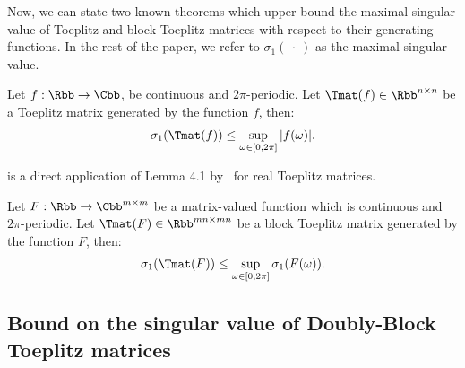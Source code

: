 Now, we can state two known theorems which upper bound the maximal singular value of Toeplitz and block Toeplitz matrices with respect to their generating functions.
In the rest of the paper, we refer to $\sigma_1(\ \cdot\ )$ as the maximal singular value. 

\begin{theorem} \label{theorem:teoplitz_sup_singular}
  Let $f: \Rbb \rightarrow \Cbb$, be continuous and $2\pi$-periodic. Let $\Tmat(f) \in \Rbb^{n \times n}$ be a Toeplitz matrix generated by the function $f$, then:
  \begin{align}
    \sigma_1 \left( \Tmat(f) \right) \leq \sup_{\omega \in [0, 2\pi]} |f(\omega)|.
  \end{align}
  \removespace
\end{theorem}

 is a direct application of  Lemma 4.1 by~\citet{gray2006toeplitz} for real Toeplitz matrices. 
  \begin{theorem} \label{theorem:block_teoplitz_sup_singular}
  Let $F: \Rbb \rightarrow \Cbb^{m \times m}$ be a matrix-valued function which is continuous and $2 \pi$-periodic.
  Let $\Tmat(F) \in \Rbb^{mn \times mn}$ be a block Toeplitz matrix generated by the function $F$, then:
  \begin{align}
    \sigma_1 \left( \Tmat(F) \right) \leq \sup_{\omega \in [0, 2\pi]} \sigma_1 \left( F\left( \omega \right) \right) .
  \end{align}
  \removespace
\end{theorem}

\subsection{Bound on the singular value of Doubly-Block Toeplitz matrices}
\label{subsection:ch5-bound_on_the_singular_value_of_doubly-block_toeplitz_matrices}

